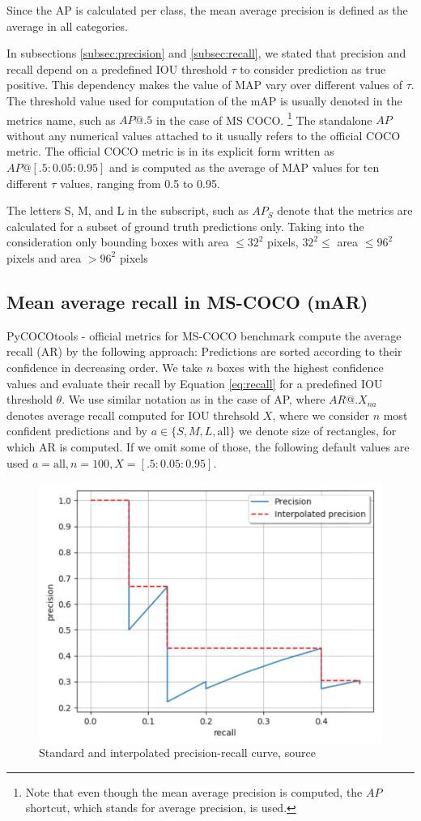 Since the AP is calculated per class, the mean average precision is defined as the average in all categories.

In subsections \ref{subsec:precision} and \ref{subsec:recall}, we stated that precision and recall depend on a predefined IOU threshold $\tau$ to consider prediction as true positive. This dependency makes the value of MAP vary over different values of $\tau$. The threshold value used for computation of the mAP is usually denoted in the metrics name, such as $AP@.5$ in the case of MS COCO. \footnote{Note that even though the mean average precision is computed, the $AP$ shortcut, which stands for average precision, is used.} The standalone $AP$ without any numerical values attached to it usually refers to the official COCO metric. The official COCO metric is in its explicit form written as $AP@[.5:0.05:0.95]$ and is computed as the average of MAP values for ten different $\tau$ values, ranging from 0.5 to 0.95.

The letters S, M,  and L in the subscript, such as $AP_S$ denote that the metrics are calculated for a subset of ground truth predictions only. Taking into the consideration only bounding boxes with area $\leq 32^2$ pixels, $32^2 \le $ area $ \leq 96^2$ pixels and area $> 96^2$ pixels

\subsection{Mean average recall in MS-COCO (mAR)}
PyCOCOtools - official metrics for MS-COCO benchmark \cite{pycocotools} compute the average recall (AR) by the following approach: Predictions are sorted according to their confidence in decreasing order. We take $n$ boxes with the highest confidence values and evaluate their recall by Equation \ref{eq:recall} for a predefined IOU threshold $\theta$. We use similar notation as in the case of AP, where $AR@.X_{na}$ denotes average recall computed for IOU threhsold $X$, where we consider $n$ most confident predictions and by $a \in \{ S, M, L, \text{all} \}$ we denote size of rectangles, for which AR is computed. If we omit some of those, the following default values are used $a=\text{all}, n = 100, X = [.5:0.05:0.95]$.

\begin{figure}
    \includegraphics[width = 0.78\linewidth]{images/PR-curve.png}
    \caption{Standard and interpolated precision-recall curve, source \cite{Padilla2020}}
    \label{fig:pr_curve}
\end{figure}



